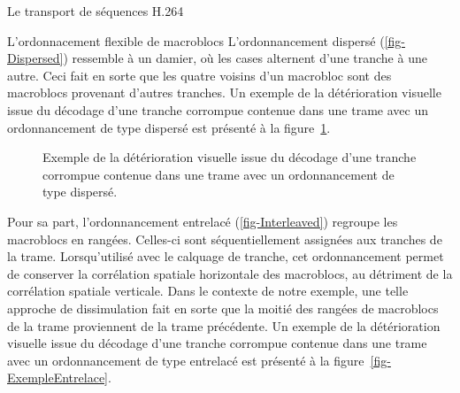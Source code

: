 \documentclass[letterpaper, twoside, 12pt,memoire]{thETS}
\newcommand{\fig}[1]{figure~\ref{#1}}
\begin{document}
\begin{chapter}{Le transport de séquences H.264}
\begin{section}{L'ordonnacement flexible de macroblocs}
L'ordonnancement dispersé (\ref{fig-Dispersed}) ressemble à un damier, où les
cases alternent d'une tranche à une autre. Ceci fait en sorte que les quatre
voisins d'un macrobloc sont des macroblocs provenant d'autres tranches. Un
exemple de la détérioration visuelle issue du décodage d'une tranche corrompue
contenue dans une trame avec un ordonnancement de type dispersé est présenté à
la \fig{fig-ExempleDisperse}. 

\begin{figure}[htb]
\caption{Exemple de la détérioration visuelle issue du décodage d'une tranche
corrompue contenue dans une trame avec un ordonnancement de type dispersé.}
\label{fig-ExempleDisperse}
\end{figure}

Pour sa part, l'ordonnancement entrelacé (\ref{fig-Interleaved}) regroupe les
macroblocs en rangées. Celles-ci sont séquentiellement assignées aux tranches de
la trame. Lorsqu'utilisé avec le calquage de tranche, cet ordonnancement permet
de conserver la corrélation spatiale horizontale des macroblocs, au détriment de
la corrélation spatiale verticale. Dans le contexte de notre exemple, une telle
approche de dissimulation fait en sorte que la moitié des rangées de
macroblocs de la trame proviennent de la trame précédente. Un exemple de la
détérioration visuelle issue du décodage d'une tranche corrompue contenue dans
une trame avec un ordonnancement de type entrelacé est présenté à la
\fig{fig-ExempleEntrelace}.


\end{section}
\end{chapter}
\end{document}
